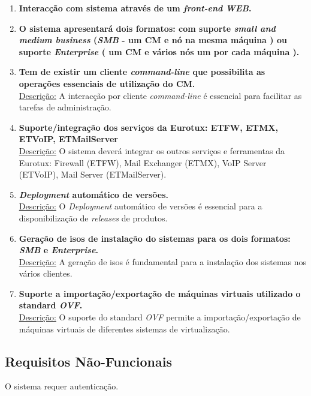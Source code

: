 \documentclass[a4paper,11pt,titlepage]{article}
\begin{document}
\begin{enumerate}
\item \textbf{Interacção com sistema através de um \emph{front-end} \emph{WEB}.} \\

\item \textbf{O sistema apresentará dois formatos: com suporte \emph{small and medium business} (\emph{SMB} - um CM e nó na mesma máquina ) ou  suporte \emph{Enterprise} ( um CM e vários nós um por cada máquina ).} \\

\item \textbf{Tem de existir um cliente \emph{command-line} que possibilita as operações essenciais de utilização do CM.} \\
\underline{Descrição:} A interacção por cliente \emph{command-line} é essencial para facilitar as tarefas de administração.

\item \textbf{Suporte/integração dos serviços da Eurotux: ETFW, ETMX, ETVoIP, ETMailServer} \\
\underline{Descrição:} O sistema deverá integrar os outros serviços e ferramentas da Eurotux: Firewall (ETFW), Mail Exchanger (ETMX), VoIP Server (ETVoIP), Mail Server (ETMailServer).

\item \textbf{\emph{Deployment} automático de versões.} \\
\underline{Descrição:} O \emph{Deployment} automático de versões é essencial para a disponibilização de \emph{releases} de produtos.

\item \textbf{Geração de isos de instalação do sistemas para os dois formatos: \emph{SMB} e \emph{Enterprise}.} \\
\underline{Descrição:} A geração de isos é fundamental para a instalação dos sistemas nos vários clientes.

\item \textbf{Suporte a importação/exportação de máquinas virtuais utilizado o standard \emph{OVF}.} \\
\underline{Descrição:} O suporte do standard \emph{OVF} permite a importação/exportação de máquinas virtuais de diferentes sistemas de virtualização.

\end{enumerate}

\subsection{Requisitos Não-Funcionais}
O sistema requer autenticação.
\end{document}
